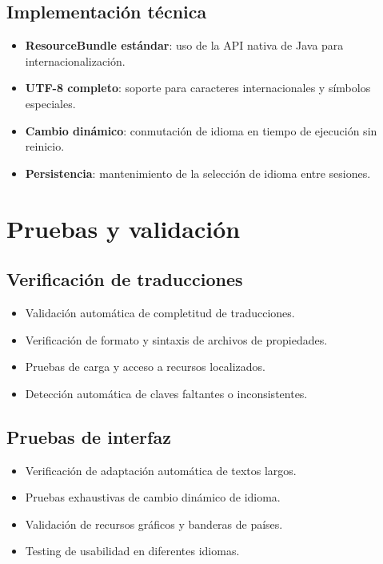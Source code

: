 \subsection{Implementación técnica}

\begin{itemize}
    \item \textbf{ResourceBundle estándar}: uso de la API nativa de Java para internacionalización.
    \item \textbf{UTF-8 completo}: soporte para caracteres internacionales y símbolos especiales.
    \item \textbf{Cambio dinámico}: conmutación de idioma en tiempo de ejecución sin reinicio.
    \item \textbf{Persistencia}: mantenimiento de la selección de idioma entre sesiones.
\end{itemize}

\section{Pruebas y validación}

\subsection{Verificación de traducciones}

\begin{itemize}
    \item Validación automática de completitud de traducciones.
    \item Verificación de formato y sintaxis de archivos de propiedades.
    \item Pruebas de carga y acceso a recursos localizados.
    \item Detección automática de claves faltantes o inconsistentes.
\end{itemize}

\subsection{Pruebas de interfaz}

\begin{itemize}
    \item Verificación de adaptación automática de textos largos.
    \item Pruebas exhaustivas de cambio dinámico de idioma.
    \item Validación de recursos gráficos y banderas de países.
    \item Testing de usabilidad en diferentes idiomas.
\end{itemize}

